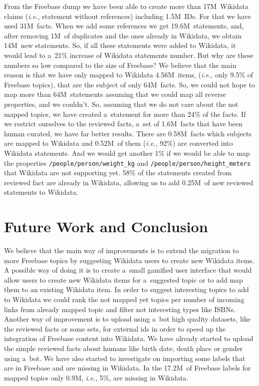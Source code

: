 \documentclass{sig-alternate}
\begin{document}
From the Freebase dump we have been able to create more than 17M~Wikidata claims
(\emph{i.e.}, statement without references) including 1.5M~IDs.
For that we have used 31M~facts.
When we add some references we get 19.6M~statements, and, after removing 1M~of duplicates
and the ones already in Wikidata, we obtain 14M~new statements.
So, if all these statements were added to Wikidata,
it would lead to a~21\% increase of Wikidata statements number.
But why are these numbers so low compared to the size of Freebase?
We believe that the main reason is that we have only mapped to Wikidata 4.56M~items, (\emph{i.e.},
only 9.5\% of Freebase topics), that are the subject of only 64M~facts.
So, we could not hope to map more than 64M~statements
assuming that we could map all reverse properties, and we couldn't.
So, assuming that we do not care about the not mapped topics,
we have created a~statement for more than 24\% of the facts.
If we restrict ourselves to the reviewed facts, a~set of 1.6M~facts
that have been human curated, we have far better results.
There are 0.58M~facts which subjects are mapped to Wikidata and 0.52M~of them
(\emph{i.e.}, 92\%) are converted into Wikidata statements.
And we would get another 1\% if we would be able
to map the properties \texttt{/people/person/weight\_kg}
and \texttt{/people/person/height\_meters} that Wikidata are not supporting yet.
58\% of the statements created from reviewed fact are already in Wikidata,
allowing us to add 0.25M~of new reviewed statements to Wikidata.

\section{Future Work and Conclusion}\label{sec:future-work-and-conclusion}

We believe that the main way of improvements is to extend the migration to more Freebase topics
by suggesting Wikidata users to create new Wikidata items.
A possible way of doing it is to create a~small gamified user interface that would allow users
to create new Wikidata items for a~suggested topic or to add map them to an existing Wikidata item.
In order to suggest interesting topics to add to Wikidata
we could rank the not mapped yet topics per number of incoming links from already mapped topic
and filter not interesting types like ISBNs.
Another way of improvement is to upload using a~bot high quality datasets,
like the reviewed facts or some sets,
for external ids in order to speed up the integration of Freebase content into Wikidata.
We have already started to upload the simple reviewed facts about humans
like birth date, death place or gender using a~bot.
We have also started to investigate on importing some labels
that are in Freebase and are missing in Wikidata.
In the 17.2M~of Freebase labels for mapped topics only 0.9M, \emph{i.e.},
5\%, are missing in Wikidata.
\end{document}
